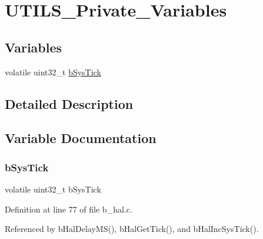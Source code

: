 \hypertarget{group___u_t_i_l_s___private___variables}{}\section{U\+T\+I\+L\+S\+\_\+\+Private\+\_\+\+Variables}
\label{group___u_t_i_l_s___private___variables}
\subsection*{Variables}
\begin{DoxyCompactItemize}
\item 
volatile uint32\+\_\+t \mbox{\hyperlink{group___u_t_i_l_s___private___variables_gaf4192a6f2331016cae3bcd9e5f2c7e20}{b\+Sys\+Tick}}
\end{DoxyCompactItemize}


\subsection{Detailed Description}


\subsection{Variable Documentation}
\mbox{\label{group___u_t_i_l_s___private___variables_gaf4192a6f2331016cae3bcd9e5f2c7e20}} 
\subsubsection{\texorpdfstring{b\+Sys\+Tick}{bSysTick}}
{\footnotesize\ttfamily volatile uint32\+\_\+t b\+Sys\+Tick}



Definition at line 77 of file b\+\_\+hal.\+c.



Referenced by b\+Hal\+Delay\+M\+S(), b\+Hal\+Get\+Tick(), and b\+Hal\+Inc\+Sys\+Tick().

